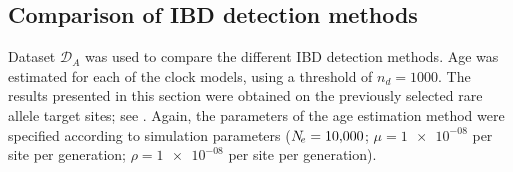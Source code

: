 %
\subsection{Comparison of IBD detection methods}\label{sec:compare_ibd_methods}
%

Dataset $\mathcal{D}_A$ was used to compare the different IBD detection methods.
Age was estimated for each of the  clock models, using a threshold of ${n_d=\num{1000}}$.
The results presented in this section were obtained on the previously selected  rare allele target sites; see .
Again, the parameters of the age estimation method were specified according to simulation parameters (${N_{\!e} = \num{10000}}$; ${\mu = \num{1e-08}}$ per site per generation; ${\rho = \num{1e-08}}$ per site per generation).








